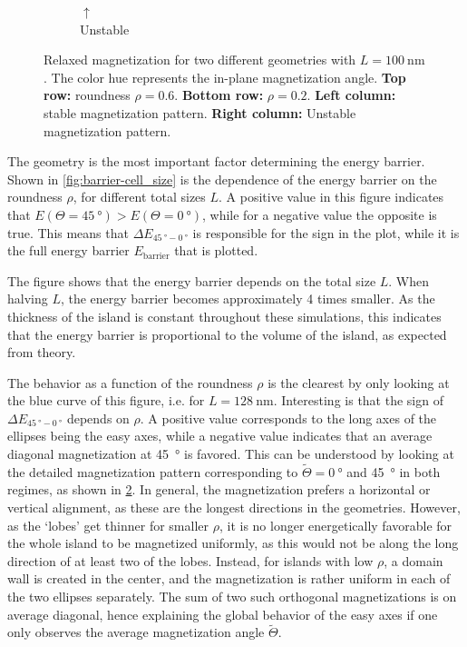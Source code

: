 \documentclass[11pt,a4paper,english]{article}
\begin{document}
\begin{figure}
\begin{subfigure}[b]{0.2\textwidth}
         \caption*{$\uparrow$\\Unstable}
         \label{fig:barrier-magnetization-20x100_ortho}
     \end{subfigure}
    \caption{Relaxed magnetization for two different geometries with $L=\SI{100}{\nano\metre}$. The color hue represents the in-plane magnetization angle. \textbf{Top row:} roundness $\rho=0.6$. \textbf{Bottom row:} $\rho=0.2$. \textbf{Left column:} stable magnetization pattern. \textbf{Right column:} Unstable magnetization pattern.}
    \label{fig:barrier-magnetization}
\end{figure}
The geometry is the most important factor determining the energy barrier. Shown in \cref{fig:barrier-cell_size} is the dependence of the energy barrier on the roundness $\rho$, for different total sizes $L$. A positive value in this figure indicates that $E(\Theta=\SI{45}{\degree}) > E(\Theta=\SI{0}{\degree})$, while for a negative value the opposite is true. This means that $\Delta E_{\SI{45}{\degree}-\SI{0}{\degree}}$ is responsible for the sign in the plot, while it is the full energy barrier $E_\mathrm{barrier}$ that is plotted. \par
The figure shows that the energy barrier depends on the total size $L$. When halving $L$, the energy barrier becomes approximately 4 times smaller. As the thickness of the island is constant throughout these simulations, this indicates that the energy barrier is proportional to the volume of the island, as expected from theory. \par
The behavior as a function of the roundness $\rho$ is the clearest by only looking at the blue curve of this figure, i.e. for $L=\SI{128}{\nano\metre}$. Interesting is that the sign of $\Delta E_{\SI{45}{\degree}-\SI{0}{\degree}}$ depends on $\rho$. A positive value corresponds to the long axes of the ellipses being the easy axes, while a negative value indicates that an average diagonal magnetization at \SI{45}{\degree} is favored. This can be understood by looking at the detailed magnetization pattern corresponding to $\widetilde{\Theta} = \SI{0}{\degree}$ and \SI{45}{\degree} in both regimes, as shown in \cref{fig:barrier-magnetization}. In general, the magnetization prefers a horizontal or vertical alignment, as these are the longest directions in the geometries. However, as the `lobes' get thinner for smaller $\rho$, it is no longer energetically favorable for the whole island to be magnetized uniformly, as this would not be along the long direction of at least two of the lobes. Instead, for islands with low $\rho$, a domain wall is created in the center, and the magnetization is rather uniform in each of the two ellipses separately. The sum of two such orthogonal magnetizations is on average diagonal, hence explaining the global behavior of the easy axes if one only observes the average magnetization angle $\widetilde{\Theta}$.
\end{document}
